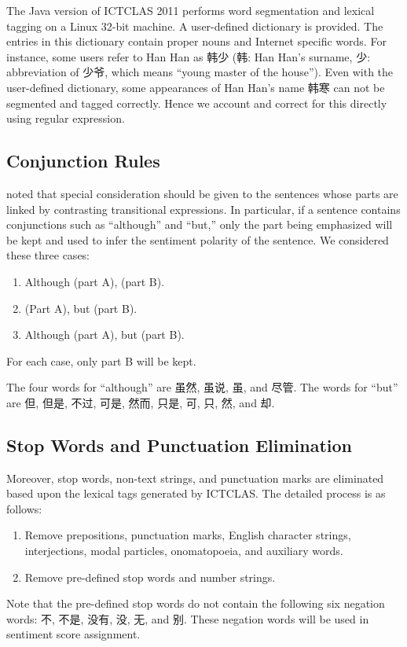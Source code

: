 \documentclass[11pt]{article}
\newcommand{\1}[1]{{\mathbf 1}\left\{#1\right\}}        %
\begin{document}
The Java version of ICTCLAS 2011 performs word segmentation and lexical tagging on a Linux 32-bit machine. A user-defined dictionary is provided. The entries in this dictionary contain proper nouns and Internet specific words. For instance, some users refer to Han Han as 韩少 (韩: Han Han's surname, 少: abbreviation of 少爷, which means ``young master of the house''). 
Even with the user-defined dictionary, some appearances of Han Han's name 韩寒 can not be segmented and tagged correctly. Hence we account and correct for this directly using regular expression.

\subsection{Conjunction Rules}

\cite{lee2011chinese} noted that special consideration should be given to the sentences whose parts are linked by contrasting transitional expressions. In particular, if a sentence contains conjunctions such as ``although'' and  ``but,'' only the part being emphasized will be kept and used to infer the sentiment polarity of the sentence. We considered these three cases:
\begin{enumerate}
\item Although (part A), (part B).
\item (Part A), but (part B).
\item Although (part A), but (part B).
\end{enumerate}
For each case, only part B will be kept. 

The four words for ``although'' are 虽然, 虽说, 虽, and 尽管. The words for ``but'' are 但, 但是, 不过, 可是, 然而, 只是, 可, 只, 然, and 却. 



\subsection{Stop Words and Punctuation Elimination}
Moreover, stop words, non-text strings, and punctuation marks are eliminated based upon the lexical tags generated by ICTCLAS. The detailed process is as follows: 
\begin{enumerate}
\item  Remove prepositions, punctuation marks, English character strings, interjections, modal particles, onomatopoeia, and auxiliary words.
\item Remove pre-defined stop words and number strings.
\end{enumerate}
Note that the pre-defined stop words do not contain the following six negation words:  不, 不是, 没有, 没, 无, and 别. These negation words will be used in sentiment score assignment.
\end{document}
